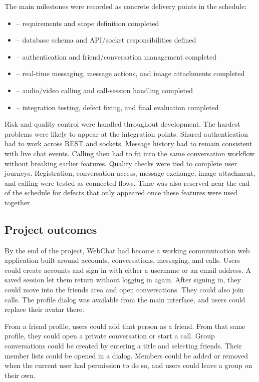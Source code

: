 \documentclass[12pt,a4paper]{article}
\begin{document}
The main milestones were recorded as concrete delivery points in the schedule:

\begin{itemize}
    \item [dd/mm] -- requirements and scope definition completed
    \item [dd/mm] -- database schema and API/socket responsibilities defined
    \item [dd/mm] -- authentication and friend/conversation management completed
    \item [dd/mm] -- real-time messaging, message actions, and image attachments completed
    \item [dd/mm] -- audio/video calling and call-session handling completed
    \item [dd/mm] -- integration testing, defect fixing, and final evaluation completed
\end{itemize}

Risk and quality control were handled throughout development. The hardest problems were likely to appear at the integration points. Shared authentication had to work across REST and sockets. Message history had to remain consistent with live chat events. Calling then had to fit into the same conversation workflow without breaking earlier features. Quality checks were tied to complete user journeys. Registration, conversation access, message exchange, image attachment, and calling were tested as connected flows. Time was also reserved near the end of the schedule for defects that only appeared once these features were used together.

\subsection{Project outcomes}
By the end of the project, WebChat had become a working communication web application built around accounts, conversations, messaging, and calls. Users could create accounts and sign in with either a username or an email address. A saved session let them return without logging in again. After signing in, they could move into the friends area and open conversations. They could also join calls. The profile dialog was available from the main interface, and users could replace their avatar there.

From a friend profile, users could add that person as a friend. From that same profile, they could open a private conversation or start a call. Group conversations could be created by entering a title and selecting friends. Their member lists could be opened in a dialog. Members could be added or removed when the current user had permission to do so, and users could leave a group on their own.
\end{document}
